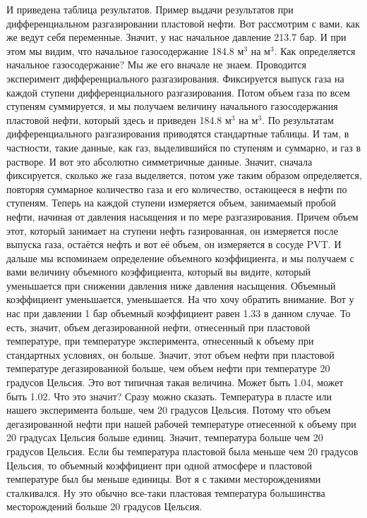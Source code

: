 \documentclass[main.tex]{subfiles}
\begin{document}
И приведена таблица результатов.
Пример выдачи результатов при дифференциальном разгазировании пластовой нефти.
Вот рассмотрим с вами, как же ведут себя переменные.
Значит, у нас начальное давление 213.7 бар.
И при этом мы видим, что начальное газосодержание 184.8 м$^3$ на м$^3$.
Как определяется начальное газосодержание?
Мы же его вначале не знаем.
Проводится эксперимент дифференциального разгазирования.
Фиксируется выпуск газа на каждой ступени дифференциального разгазирования.
Потом объем газа по всем ступеням суммируется, и мы получаем величину начального газосодержания пластовой нефти, который здесь и приведен 184.8 м$^3$ на м$^3$.
По результатам дифференциального разгазирования приводятся стандартные таблицы.
И там, в частности, такие данные, как газ, выделившийся по ступеням и суммарно, и газ в растворе.
И вот это абсолютно симметричные данные.
Значит, сначала фиксируется, сколько же газа выделяется, потом уже таким образом определяется, повторяя суммарное количество газа и его количество, остающееся в нефти по ступеням.
Теперь на каждой ступени измеряется объем, занимаемый пробой нефти, начиная от давления насыщения и по мере разгазирования.
Причем объем этот, который занимает на ступени нефть газированная, он измеряется после выпуска газа, остаётся нефть и вот её объем, он измеряется в сосуде PVT.
И дальше мы вспоминаем определение объемного коэффициента, и мы получаем с вами величину объемного коэффициента, который вы видите, который уменьшается при снижении давления ниже давления насыщения.
Объемный коэффициент уменьшается, уменьшается.
На что хочу обратить внимание.
Вот у нас при давлении 1 бар объемный коэффициент равен 1.33 в данном случае.
То есть, значит, объем дегазированной нефти, отнесенный при пластовой температуре, при температуре эксперимента, отнесенный к объему при стандартных условиях, он больше.
Значит, этот объем нефти при пластовой температуре дегазированной больше, чем объем нефти при температуре 20 градусов Цельсия.
Это вот типичная такая величина.
Может быть 1.04, может быть 1.02.
Что это значит?
Сразу можно сказать.
Температура в пласте или нашего эксперимента больше, чем 20 градусов Цельсия.
Потому что объем дегазированной нефти при нашей рабочей температуре отнесенной к объему при 20 градусах Цельсия больше единиц.
Значит, температура больше чем 20 градусов Цельсия.
Если бы температура пластовой была меньше чем 20 градусов Цельсия, то объемный коэффициент при одной атмосфере и пластовой температуре был бы меньше единицы.
Вот я с такими месторождениями сталкивался.
Ну это обычно все-таки пластовая температура большинства месторождений больше 20 градусов Цельсия.
\end{document}
